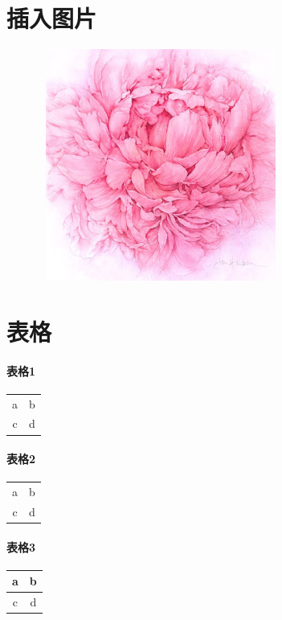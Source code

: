 \documentclass{ctexart}
\begin{document}
    \section{插入图片}
\includegraphics[width=4.00in,height=3.00in]{1.eps}

    \section{表格}
    \paragraph{表格1}
    \begin{tabular}{|c|c|}
    a & b \\
    c &d \\
    \end{tabular}
    
    \paragraph{表格2}
    \begin{tabular}{|c|c|}
    \hline
    a & b \\
    c &d \\
    \hline
    \end{tabular}

    \paragraph{表格3}
    \begin{tabular}{|c|c|}
    \hline
    a & b \\
    \hline
    c &d \\
    \hline
    \end{tabular}
\end{document}
